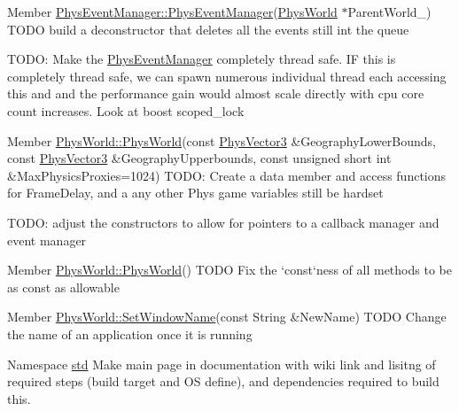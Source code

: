\label{dd/da0/todo__todo000003}
\hypertarget{dd/da0/todo__todo000003}{}
 
\begin{DoxyDescription}
\item[Member \hyperlink{classPhysEventManager_a1355f36d99de303cec6f3b27cadaa9ff}{PhysEventManager::PhysEventManager}(\hyperlink{classPhysWorld}{PhysWorld} $\ast$ParentWorld\_\-) ]TODO build a deconstructor that deletes all the events still int the queue 

TODO: Make the \hyperlink{classPhysEventManager}{PhysEventManager} completely thread safe. IF this is completely thread safe, we can spawn numerous individual thread each accessing this and and the performance gain would almost scale directly with cpu core count increases. Look at boost scoped\_\-lock 
\end{DoxyDescription}

\label{dd/da0/todo__todo000012}
\hypertarget{dd/da0/todo__todo000012}{}
 
\begin{DoxyDescription}
\item[Member \hyperlink{classPhysWorld_a12892fd39d20cb671e23038d10ec4d94}{PhysWorld::PhysWorld}(const \hyperlink{classPhysVector3}{PhysVector3} \&GeographyLowerBounds, const \hyperlink{classPhysVector3}{PhysVector3} \&GeographyUpperbounds, const unsigned short int \&MaxPhysicsProxies=1024) ]TODO: Create a data member and access functions for FrameDelay, and a any other Phys game variables still be hardset 

TODO: adjust the constructors to allow for pointers to a callback manager and event manager 
\end{DoxyDescription}

\label{dd/da0/todo__todo000006}
\hypertarget{dd/da0/todo__todo000006}{}
 
\begin{DoxyDescription}
\item[Member \hyperlink{classPhysWorld_a6ded8026b0cd72e7877830698197adf0}{PhysWorld::PhysWorld}() ]TODO Fix the `const`ness of all methods to be as const as allowable 
\end{DoxyDescription}

\label{dd/da0/todo__todo000011}
\hypertarget{dd/da0/todo__todo000011}{}
 
\begin{DoxyDescription}
\item[Member \hyperlink{classPhysWorld_abab1d26203cb8386d6a51f4fc0b0a1e4}{PhysWorld::SetWindowName}(const String \&NewName) ]TODO Change the name of an application once it is running 
\end{DoxyDescription}

\label{dd/da0/todo__todo000001}
\hypertarget{dd/da0/todo__todo000001}{}
 
\begin{DoxyDescription}
\item[Namespace \hyperlink{namespacestd}{std} ]Make main page in documentation with wiki link and lisitng of required steps (build target and OS define), and dependencies required to build this. 
\end{DoxyDescription}